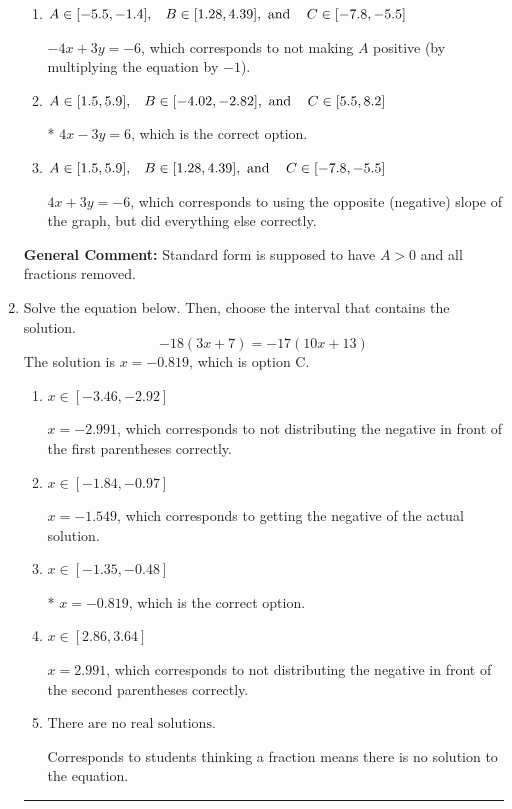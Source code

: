 \documentclass{extbook}[14pt]
\newcommand{\litem}[1]{\item #1

\rule{\textwidth}{0.4pt}}
\begin{document}
\begin{enumerate}
{\begin{enumerate}[label=\Alph*.]
 $-1.333x + 1y = -2.0$, which corresponds to not removing rational values for Standard Form.
\item \( A \in [-5.5, -1.4], \hspace{3mm} B \in [1.28, 4.39], \text{ and } \hspace{3mm} C \in [-7.8, -5.5] \)

 $-4x + 3y = -6$, which corresponds to not making $A$ positive (by multiplying the equation by $-1$).
\item \( A \in [1.5, 5.9], \hspace{3mm} B \in [-4.02, -2.82], \text{ and } \hspace{3mm} C \in [5.5, 8.2] \)

* $4x - 3y = 6$, which is the correct option.
\item \( A \in [1.5, 5.9], \hspace{3mm} B \in [1.28, 4.39], \text{ and } \hspace{3mm} C \in [-7.8, -5.5] \)

 $4x + 3y = -6$, which corresponds to using the opposite (negative) slope of the graph, but did everything else correctly.
\end{enumerate}

\textbf{General Comment:} Standard form is supposed to have $A > 0$ and all fractions removed.
}
\litem{
Solve the equation below. Then, choose the interval that contains the solution.
\[ -18(3x + 7) = -17(10x + 13) \]The solution is \( x = -0.819 \), which is option C.\begin{enumerate}[label=\Alph*.]
\item \( x \in [-3.46, -2.92] \)

$x = -2.991$, which corresponds to not distributing the negative in front of the first parentheses correctly.
\item \( x \in [-1.84, -0.97] \)

$x = -1.549$, which corresponds to getting the negative of the actual solution.
\item \( x \in [-1.35, -0.48] \)

* $x = -0.819$, which is the correct option.
\item \( x \in [2.86, 3.64] \)

$x = 2.991$, which corresponds to not distributing the negative in front of the second parentheses correctly.
\item \( \text{There are no real solutions.} \)

Corresponds to students thinking a fraction means there is no solution to the equation.
\end{enumerate}

}
\end{enumerate}
\end{document}
